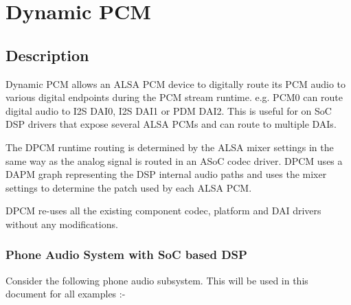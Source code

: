 \documentclass[a4paper,8pt,english]{sphinxmanual}
\begin{document}
\section{Dynamic PCM}
\label{sound/soc/dpcm:dynamic-pcm}\label{sound/soc/dpcm::doc}

\subsection{Description}
\label{sound/soc/dpcm:description}
Dynamic PCM allows an ALSA PCM device to digitally route its PCM audio to
various digital endpoints during the PCM stream runtime. e.g. PCM0 can route
digital audio to I2S DAI0, I2S DAI1 or PDM DAI2. This is useful for on SoC DSP
drivers that expose several ALSA PCMs and can route to multiple DAIs.

The DPCM runtime routing is determined by the ALSA mixer settings in the same
way as the analog signal is routed in an ASoC codec driver. DPCM uses a DAPM
graph representing the DSP internal audio paths and uses the mixer settings to
determine the patch used by each ALSA PCM.

DPCM re-uses all the existing component codec, platform and DAI drivers without
any modifications.


\subsubsection{Phone Audio System with SoC based DSP}
\label{sound/soc/dpcm:phone-audio-system-with-soc-based-dsp}
Consider the following phone audio subsystem. This will be used in this
document for all examples :-
\end{document}
